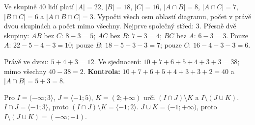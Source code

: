 \documentclass[11pt,a4paper]{article}
\begin{document}
\begin{prikladReseniBox}[title={Rozšíření 1}]
Ve skupině $40$ lidí platí $|A|=22$, $|B|=18$, $|C|=16$,
$|A\cap B|=8$, $|A\cap C|=7$, $|B\cap C|=6$ a
$|A\cap B\cap C|=3$. Vypočti všech osm oblastí diagramu,
počet v právě dvou skupinách a počet mimo všechny.
\tcblower
Nejprve společný střed: $3$.
Přesně dvě skupiny: $AB$ bez $C$: $8-3=5$;
$AC$ bez $B$: $7-3=4$; $BC$ bez $A$: $6-3=3$.
Pouze $A$: $22-5-4-3=10$;
pouze $B$: $18-5-3-3=7$;
pouze $C$: $16-4-3-3=6$.
\begin{center}
\end{center}
Právě ve dvou: $5+4+3=12$.
Ve sjednocení: $10+7+6+5+4+3+3=38$;
mimo všechny $40-38=2$.
\textbf{Kontrola:} $10+7+6+5+4+3+3+2=40$ a
$|A\cap B|=5+3=8$.
\end{prikladReseniBox}

\begin{zadaniReseniBox}[title={Rozšíření 2}]
Pro $I=(-\infty;3\rangle$, $J=\langle-1;5)$,
$K=(2;+\infty)$ urči $(I\cap J)\setminus K$ a $I\setminus(J\cup K)$.
\tcblower
$I\cap J=\langle-1;3\rangle$, proto
$(I\cap J)\setminus K=\langle-1;2\rangle$.
$J\cup K=\langle-1;+\infty)$, proto
$I\setminus(J\cup K)=(-\infty;-1)$.
\end{zadaniReseniBox}
\end{document}
